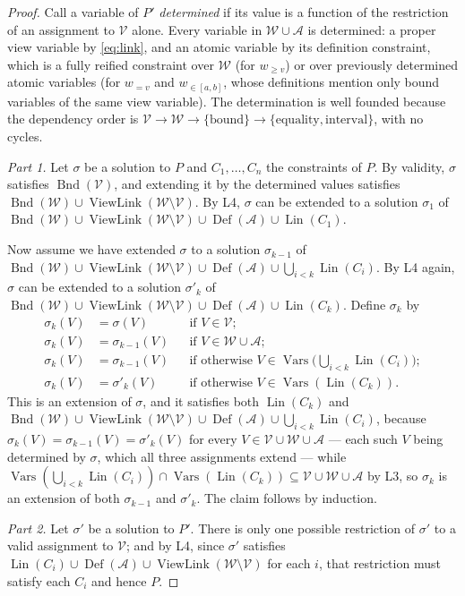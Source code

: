 \documentclass[11pt,a4paper]{article}
\theoremstyle{plain}
\theoremstyle{definition}
\theoremstyle{remark}
\newcommand{\fname}[1]{\ensuremath{\operatorname{#1}}}
\newcommand{\Bnd}{\fname{Bnd}}
\newcommand{\Def}{\fname{Def}}
\newcommand{\Lin}{\fname{Lin}}
\newcommand{\Vars}{\fname{Vars}}
\newcommand{\ViewLink}{\fname{ViewLink}}
\newcommand{\atge}[2]{#1_{\geq #2}}
\newcommand{\ateq}[2]{#1_{= #2}}
\newcommand{\atin}[3]{#1_{\in[#2,#3]}}
\begin{document}
\begin{proof}
Call a variable of $P'$ \emph{determined} if its value is a function of the
restriction of an assignment to $\mathcal V$ alone.  Every variable in
$\mathcal W\cup\mathcal A$ is determined: a proper view variable by
\cref{eq:link}, and an atomic variable by its definition constraint, which is a
fully reified constraint over $\mathcal W$ (for $\atge{w}{v}$) or over
previously determined atomic variables (for $\ateq{w}{v}$ and $\atin{w}{a}{b}$,
whose definitions mention only bound variables of the same view variable).
The determination is well founded because the dependency order is
$\mathcal V \to \mathcal W \to \{\text{bound}\} \to
\{\text{equality},\text{interval}\}$, with no cycles.

\emph{Part 1.}  Let $\sigma$ be a solution to $P$ and $C_1,\dots,C_n$ the
constraints of $P$.  By validity, $\sigma$ satisfies $\Bnd(\mathcal V)$, and
extending it by the determined values satisfies $\Bnd(\mathcal
W)\cup\ViewLink(\mathcal W\setminus\mathcal V)$.  By L4, $\sigma$ can be extended to a solution
$\sigma_1$ of $\Bnd(\mathcal W)\cup\ViewLink(\mathcal W\setminus\mathcal V)\cup\Def(\mathcal
A)\cup\Lin(C_1)$.

Now assume we have extended $\sigma$ to a solution $\sigma_{k-1}$ of
$\Bnd(\mathcal W)\cup\ViewLink(\mathcal W\setminus\mathcal V)\cup\Def(\mathcal A)\cup
\bigcup_{i<k}\Lin(C_i)$.  By L4 again, $\sigma$ can be extended to a solution
$\sigma'_k$ of $\Bnd(\mathcal W)\cup\ViewLink(\mathcal W\setminus\mathcal V)\cup\Def(\mathcal
A)\cup\Lin(C_k)$.  Define $\sigma_k$ by
\begin{align}
  \sigma_k(V) &= \sigma(V) && \text{if } V\in\mathcal V; \\
  \sigma_k(V) &= \sigma_{k-1}(V) && \text{if } V\in\mathcal W\cup\mathcal A; \\
  \sigma_k(V) &= \sigma_{k-1}(V) && \text{if otherwise }
     V\in\Vars\bigl(\bigcup_{i<k}\Lin(C_i)\bigr); \\
  \sigma_k(V) &= \sigma'_k(V) && \text{if otherwise } V\in\Vars(\Lin(C_k)).
\end{align}
This is an extension of $\sigma$, and it satisfies both $\Lin(C_k)$ and
$\Bnd(\mathcal W)\cup\ViewLink(\mathcal W\setminus\mathcal V)\cup\Def(\mathcal A)\cup
\bigcup_{i<k}\Lin(C_i)$, because
$\sigma_k(V)=\sigma_{k-1}(V)=\sigma'_k(V)$ for every $V\in\mathcal
V\cup\mathcal W\cup\mathcal A$ --- each such $V$ being determined by $\sigma$,
which all three assignments extend --- while
$\Vars(\bigcup_{i<k}\Lin(C_i))\cap\Vars(\Lin(C_k))\subseteq
\mathcal V\cup\mathcal W\cup\mathcal A$ by L3, so $\sigma_k$ is an extension of
both $\sigma_{k-1}$ and $\sigma'_k$.  The claim follows by induction.

\emph{Part 2.}  Let $\sigma'$ be a solution to $P'$.  There is only one
possible restriction of $\sigma'$ to a valid assignment to $\mathcal V$; and by
L4, since $\sigma'$ satisfies $\Lin(C_i)\cup\Def(\mathcal A)\cup\ViewLink(\mathcal
W\setminus\mathcal V)$ for each $i$, that restriction must satisfy each $C_i$ and hence $P$.
\end{proof}
\end{document}
